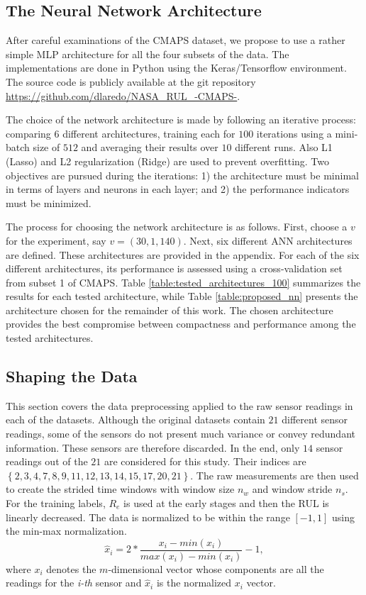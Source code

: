 \documentclass[12pt]{IEEEtran}%
\begin{document}
\subsection{The Neural Network Architecture}

After careful examinations of the CMAPS dataset, we propose to use a rather
simple MLP architecture for all the four subsets of the data. The
implementations are done in Python using the Keras/Tensorflow environment. The
source code is publicly available at the git repository \url{https://github.com/dlaredo/NASA_RUL_-CMAPS-}.

The choice of the network architecture is made by following an iterative
process: comparing 6 different architectures, training each for $100$
iterations using a mini-batch size of $512$ and averaging their results over
$10$ different runs. Also L1 (Lasso) and L2 regularization (Ridge) 
\cite{Buhlmann2011} are used to prevent overfitting. 
Two objectives are pursued during the iterations: 1) the architecture must be minimal in 
terms of layers and neurons in each layer; and 2) the performance indicators must be minimized.

The process for choosing the network architecture is as follows. First, choose
a $v$ for the experiment, say $v= (30, 1, 140)$. Next, six different ANN
architectures are defined. These architectures are provided in
the appendix. For each of the six different architectures,
its performance is assessed using a cross-validation set from subset 1 of
CMAPS. Table \ref{table:tested_architectures_100} summarizes the results for
each tested architecture, while Table \ref{table:proposed_nn} presents the
architecture chosen for the remainder of this work. The chosen architecture
provides the best compromise between compactness and performance among the
tested architectures.

\subsection{Shaping the Data}

This section covers the data preprocessing applied to the raw sensor readings
in each of the datasets. Although the original datasets contain $21$ different
sensor readings, some of the sensors do not present much variance or convey
redundant information. These sensors are therefore discarded. In the end, only
$14$ sensor readings out of the $21$ are considered for this study. Their
indices are $\left\lbrace 2, 3, 4, 7, 8, 9, 11, 12, 13, 14, 15, 17, 20, 21
\right\rbrace $. The raw measurements are then used to create the strided time
windows with window size $n_{w}$ and window stride $n_{s}$. For the training
labels, $R_{e}$ is used at the early stages and then the RUL is linearly
decreased. The data is normalized to be within the range $\left[  -1,1
\right]  $ using the min-max normalization.
\begin{equation}
\hat{x}_{i} = 2* \frac{x_{i} - min(x_{i})}{max(x_{i}) - min(x_{i})} - 1,
\label{eq:min_max_norm}%
\end{equation}
where $x_{i}$ denotes the $m$-dimensional vector whose components are all the
readings for the \textit{i-th} sensor and $\hat{x}_{i}$ is the normalized
$x_{i}$ vector.
\end{document}
